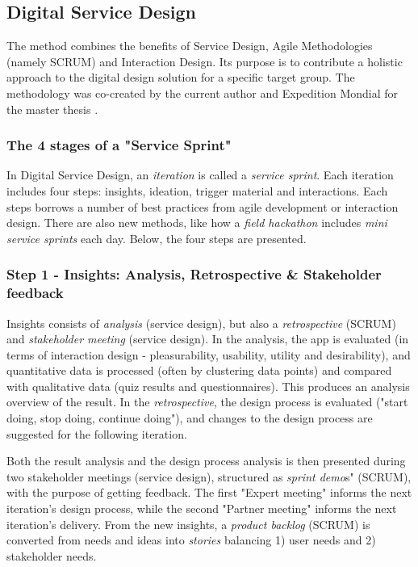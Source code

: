 \subsection{Digital Service Design} \label{digital-service-design}

The method combines the benefits of Service Design, Agile Methodologies (namely SCRUM) and Interaction Design. Its purpose is to contribute a holistic approach to the digital design solution for a specific target group. The methodology was co-created by the current author and Expedition Mondial for the master thesis \citep{nissar}.

\subsubsection{The 4 stages of a "Service Sprint"}
In Digital Service Design, an \textit{iteration} is called a \textit{service sprint}. Each iteration includes four steps: insights, ideation, trigger material and interactions. Each steps borrows a number of best practices from agile development or interaction design. There are also new methods, like how a \textit{field hackathon} includes \textit{mini service sprints} each day. Below, the four steps are presented.

\subsubsection{Step 1 - Insights: Analysis, Retrospective \& Stakeholder feedback}
  Insights consists of \textit{analysis} (service design), but also a \textit{retrospective} (SCRUM) and \textit{stakeholder meeting} (service design). In the analysis, the app is evaluated (in terms of interaction design - pleasurability, usability, utility and desirability), and quantitative data is processed (often by clustering data points) and compared with qualitative data (quiz results and questionnaires). This produces an analysis overview of the result. In the \textit{retrospective}, the design process is evaluated ("start doing, stop doing, continue doing"), and changes to the design process are suggested for the following iteration.

    Both the result analysis and the design process analysis is then presented during two stakeholder meetings (service design), structured as \textit{sprint demo}s" (SCRUM), with the purpose of getting feedback. The first "Expert meeting" informs the next iteration's design process, while the second "Partner meeting" informs the next iteration's delivery. From the new insights, a \textit{product backlog} (SCRUM) is converted from needs and ideas into \textit{stories} balancing 1) user needs and 2) stakeholder needs.

